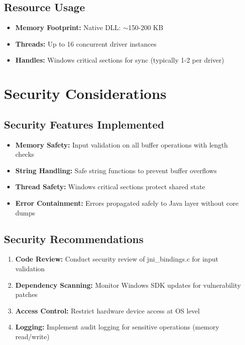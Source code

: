\documentclass[12pt,a4paper]{article}
\begin{document}
\subsection{Resource Usage}

\begin{itemize}
    \item \textbf{Memory Footprint:} Native DLL: $\sim$150-200 KB
    \item \textbf{Threads:} Up to 16 concurrent driver instances
    \item \textbf{Handles:} Windows critical sections for sync (typically 1-2 per driver)
\end{itemize}

\newpage

\section{Security Considerations}

\subsection{Security Features Implemented}

\begin{itemize}
    \item \textbf{Memory Safety:} Input validation on all buffer operations with length checks
    \item \textbf{String Handling:} Safe string functions to prevent buffer overflows
    \item \textbf{Thread Safety:} Windows critical sections protect shared state
    \item \textbf{Error Containment:} Errors propagated safely to Java layer without core dumps
\end{itemize}

\subsection{Security Recommendations}

\begin{enumerate}
    \item \textbf{Code Review:} Conduct security review of jni\_bindings.c for input validation
    \item \textbf{Dependency Scanning:} Monitor Windows SDK updates for vulnerability patches
    \item \textbf{Access Control:} Restrict hardware device access at OS level
    \item \textbf{Logging:} Implement audit logging for sensitive operations (memory read/write)
\end{enumerate}
\end{document}
